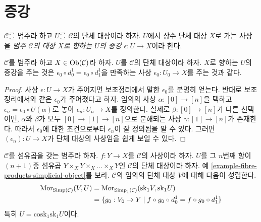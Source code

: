 \section{증강}
\label{section-augmentation}

\begin{definition}
\label{definition-augmentation}
$\mathcal{C}$를 범주라 하고 $U$를 $\mathcal{C}$의 단체 대상이라 하자.
$U$에서 상수 단체 대상 $X$로 가는 사상을
{\it 범주 $\mathcal{C}$의 대상 $X$로 향하는 $U$의 증강
$\epsilon : U \to X$}이라 한다.
\end{definition}

\begin{lemma}
\label{lemma-augmentation-howto}
$\mathcal{C}$를 범주라 하고 $X \in \mathop{\mathrm{Ob}}\nolimits(\mathcal{C})$라 하자.
$U$를 $\mathcal{C}$의 단체 대상이라 하자. $X$로 향하는 $U$의 증강을
주는 것은 $\epsilon_0 \circ d^1_0 = \epsilon_0 \circ d^1_1$을 만족하는
사상 $\epsilon_0 : U_0 \to X$를 주는 것과 같다.
\end{lemma}

\begin{proof}
사상 $\epsilon : U \to X$가 주어지면 보조정리에서 말한
$\epsilon_0$를 분명히 얻는다. 반대로 보조정리에서와 같은
$\epsilon_0$가 주어졌다고 하자. 임의의 사상
$\alpha : [0] \to [n]$을 택하고
$\epsilon_n = \epsilon_0 \circ U(\alpha)$로 놓아
$\epsilon_n : U_n \to X$를 정의한다. 실제로
$\beta : [0] \to [n]$가 다른 선택이면, $\alpha$와 $\beta$가 모두
$[0] \to [1] \to [n]$으로 분해되는 사상 $\gamma : [1] \to [n]$가
존재한다. 따라서 $\epsilon_0$에 대한 조건으로부터 $\epsilon_n$이
잘 정의됨을 알 수 있다. 그러면 $(\epsilon_n) : U \to X$가 단체 대상의
사상임을 쉽게 보일 수 있다.
\end{proof}

\begin{lemma}
\label{lemma-cosk-minus-one}
$\mathcal{C}$를 섬유곱을 갖는 범주라 하자. $f : Y\to X$를
$\mathcal{C}$의 사상이라 하자. $U$를 그 $n$번째 항이 $(n + 1)$중 섬유곱
$Y \times_X Y \times_X \ldots \times_X Y$인 $\mathcal{C}$의 단체 대상이라
하자. 예 \ref{example-fibre-products-simplicial-object}를 보라.
$\mathcal{C}$의 임의의 단체 대상 $V$에 대해 다음이 성립한다.
\begin{align*}
\mathop{\mathrm{Mor}}\nolimits_{\text{Simp}(\mathcal{C})}(V, U)
& =
\mathop{\mathrm{Mor}}\nolimits_{\text{Simp}_1(\mathcal{C})}(\text{sk}_1 V, \text{sk}_1 U) \\
& =
\{g_0 : V_0 \to Y \mid f \circ g_0 \circ d^1_0 = f \circ g_0 \circ d^1_1\}
\end{align*}
특히 $U = \text{cosk}_1 \text{sk}_1 U$이다.
\end{lemma}

